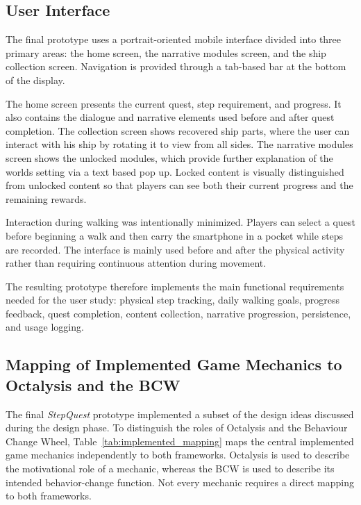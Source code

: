 \subsection{User Interface}

The final prototype uses a portrait-oriented mobile interface divided into three primary areas: the home screen, the narrative modules screen, and the ship collection screen. Navigation is provided through a tab-based bar at the bottom of the display.

The home screen presents the current quest, step requirement, and progress. It also contains the dialogue and narrative elements used before and after quest completion. The collection screen shows recovered ship parts, where the user can interact with his ship by rotating it to view from all sides. The narrative modules screen shows the unlocked modules, which provide further explanation of the worlds setting via a text based pop up. Locked content is visually distinguished from unlocked content so that players can see both their current progress and the remaining rewards.

Interaction during walking was intentionally minimized. Players can select a quest before beginning a walk and then carry the smartphone in a pocket while steps are recorded. The interface is mainly used before and after the physical activity rather than requiring continuous attention during movement.

The resulting prototype therefore implements the main functional requirements needed for the user study: physical step tracking, daily walking goals, progress feedback, quest completion, content collection, narrative progression, persistence, and usage logging.

\subsection{Mapping of Implemented Game Mechanics to Octalysis and the BCW}

The final \textit{StepQuest} prototype implemented a subset of the design ideas discussed during the design phase. To distinguish the roles of Octalysis and the Behaviour Change Wheel, Table~\ref{tab:implemented_mapping} maps the central implemented game mechanics independently to both frameworks. Octalysis is used to describe the motivational role of a mechanic, whereas the BCW is used to describe its intended behavior-change function. Not every mechanic requires a direct mapping to both frameworks.

